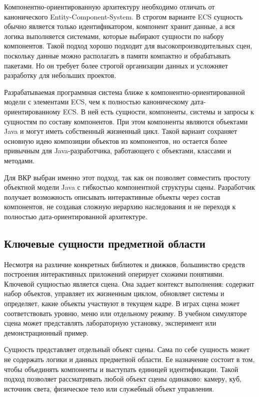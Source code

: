 Компонентно-ориентированную архитектуру необходимо отличать от
канонического Entity-Component-System. В строгом варианте ECS сущность
обычно является только идентификатором, компонент хранит данные, а вся
логика выполняется системами, которые выбирают сущности по набору
компонентов. Такой подход хорошо подходит для высокопроизводительных
сцен, поскольку данные можно располагать в памяти компактно и обрабатывать
пакетами. Но он требует более строгой организации данных и усложняет
разработку для небольших проектов.

Разрабатываемая программная система ближе к компонентно-ориентированной
модели с элементами ECS, чем к полностью каноническому
дата-ориентированному ECS. В ней есть сущности, компоненты, системы и
запросы к сущностям по составу компонентов. При этом компоненты являются
объектами Java и могут иметь собственный жизненный цикл. Такой вариант
сохраняет основную идею композиции объектов из компонентов, но остается
более привычным для Java-разработчика, работающего с объектами, классами
и методами.

Для ВКР выбран именно этот подход, так как он позволяет совместить
простоту объектной модели Java с гибкостью компонентной структуры сцены.
Разработчик получает возможность описывать интерактивные объекты через
состав компонентов, не создавая сложную иерархию наследования и не
переходя к полностью дата-ориентированной архитектуре.

\subsection{Ключевые сущности предметной области}

Несмотря на различие конкретных библиотек и движков, большинство
средств построения интерактивных приложений оперирует схожими
понятиями. Ключевой сущностью является сцена. Она задает контекст
выполнения: содержит набор объектов, управляет их жизненным циклом,
обновляет системы и определяет, какие объекты участвуют в текущем кадре.
В играх сцена может соответствовать уровню, меню или отдельному режиму.
В учебном симуляторе сцена может представлять лабораторную установку,
эксперимент или демонстрационный пример.

Сущность представляет отдельный объект сцены. Сама по себе сущность
может не содержать логики и данных предметной области. Ее назначение
состоит в том, чтобы объединять компоненты и выступать единицей
идентификации. Такой подход позволяет рассматривать любой объект сцены
одинаково: камеру, куб, источник света, физическое тело или служебный
объект управления.

